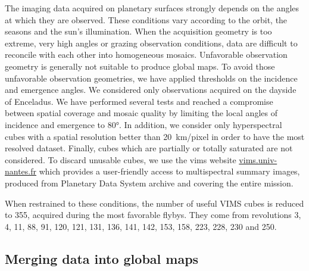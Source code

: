 \documentclass{arxiv-icarus}
\begin{document}
\begin{figure*}[!ht]
    \caption{Global mosaic in equirectangular projection at \SI{1.8}{\um}, containing all the 355 VIMS cubes responding to thresholds mentioned in , before the photometric correction.}
    \label{fig:fig_1}
\end{figure*}

\begin{figure*}[!ht]
    \caption{Global mosaics of incidence, emergence, phase angles and the pixel spatial resolution.}
    \label{fig:fig_2}
\end{figure*}

The imaging data acquired on planetary surfaces strongly depends on the angles at which they are observed. These conditions vary according to the orbit, the seasons and the sun's illumination. When the acquisition geometry is too extreme, \eg very high angles or grazing observation conditions, data are difficult to reconcile with each other into homogeneous mosaics. Unfavorable observation geometry is generally not suitable to produce global maps. To avoid those unfavorable observation geometries, we have applied thresholds on the incidence and emergence angles. We considered only observations acquired on the dayside of Enceladus. We have performed several tests and reached a compromise between spatial coverage and mosaic quality by limiting the local angles of incidence and emergence to \ang{80}. In addition, we consider only hyperspectral cubes with a spatial resolution better than \SI{20}{km/pixel} in order to have the most resolved dataset. Finally, cubes which are partially or totally saturated are not considered. To discard unusable cubes, we use the vims website \href{https://vims.univ-nantes.fr}{vims.univ-nantes.fr} which provides a user-friendly access to multispectral summary images, produced from Planetary Data System archive and covering the entire mission.

When restrained to these conditions, the number of useful VIMS cubes is reduced to 355, acquired during the most favorable flybys. They come from revolutions 3, 4, 11, 88, 91, 120, 121, 131, 136, 141, 142, 153, 158, 223, 228, 230 and 250.


\subsection{Merging data into global maps}
\end{document}
